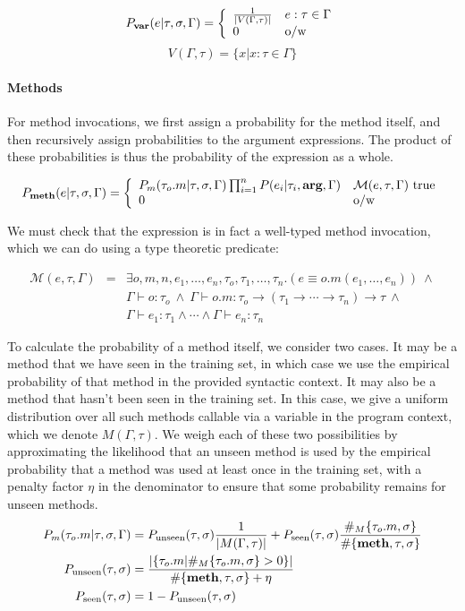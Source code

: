 \documentclass{article} %
\begin{document}
$$P_{\textbf{var}}(e | \tau, \sigma, \Gamma) = 
\left\{
	\begin{array}{ll}
	\frac{1}{|V(\Gamma, \tau)|} & e : \tau \in \Gamma\\
	0 & \mbox{o/w}
	\end{array}
\right.$$
$$V(\Gamma, \tau) = \{ x | x : \tau \in \Gamma\}$$


\paragraph{Methods} For method invocations, we first assign a probability for the method itself, and then recursively assign probabilities to the argument expressions. The product of these probabilities is thus the probability of the expression as a whole.

$$P_{\textbf{meth}}(e | \tau, \sigma, \Gamma) = 
\left\{
	\begin{array}{ll}
          P_m(\tau_o.m | \tau, \sigma, \Gamma) \prod_{i=1}^n P(e_i | \tau_i, \textbf{arg}, \Gamma)  & \mathcal{M}(e, \tau, \Gamma)\mbox{ true} \\
	0 & \mbox{o/w}
	\end{array}
\right.$$

We must check that the expression is in fact a well-typed method invocation, which we can do using a type theoretic predicate:

$$\begin{array}{lll}
\mathcal{M}(e, \tau, \Gamma) & = & \exists o, m, n, e_1, \ldots, e_n, \tau_o, \tau_1, \ldots, \tau_n. (e \equiv o.m(e_1, \ldots, e_n))~\land\\
 & & 
\Gamma \vdash o : \tau_o~\land~\Gamma \vdash o.m : \tau_o \to (\tau_1 \to \cdots \to \tau_n) \to \tau~\land~\\
 & & \Gamma \vdash e_1 : \tau_1 \land \cdots \land \Gamma \vdash e_n : \tau_n
\end{array}$$

To calculate the probability of a method itself, we consider two cases. It may be a method that we have seen in the training set, in which case we use the empirical probability of that method in the provided syntactic context. It may also be a method that hasn't been seen in the training set. In this case, we give a uniform distribution over all such methods callable via a variable in the program context, which we denote $M(\Gamma, \tau)$. We weigh each of these two possibilities by approximating the likelihood that an unseen method is used by the empirical probability that a method was used at least once in the training set, with a penalty factor $\eta$ in the denominator to ensure that some probability remains for unseen methods. 
\begin{align*}
P_m(\tau_o.m | \tau, \sigma, \Gamma) & =  P_{\text{unseen}}(\tau, \sigma)\frac{1}{|M(\Gamma, \tau)|} + 
P_{\text{seen}}(\tau, \sigma)\frac{\#_M\{\tau_o.m, \sigma\}}{\#\{\textbf{meth}, \tau, \sigma\}}\\
P_{\text{unseen}}(\tau, \sigma) & =  \frac{ |\{\tau_o.m | \#_M\{\tau_o.m, \sigma\} > 0\}|}{\#\{\textbf{meth}, \tau, \sigma\} + \eta}\\
P_{\text{seen}}(\tau, \sigma) & =  1 - P_{\text{unseen}}(\tau, \sigma)
\end{align*}
\end{document}
